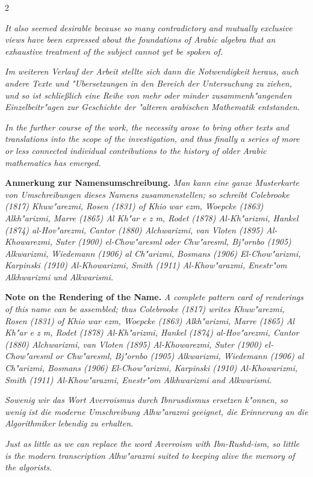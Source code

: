 \documentclass[10pt,a4paper]{article}
\begin{document}
\begin{paracol}{2}
\switchcolumn

\textit{It also seemed desirable because so many contradictory and mutually exclusive views have been expressed about the foundations of Arabic algebra that an exhaustive treatment of the subject cannot yet be spoken of.}

\switchcolumn*

\textit{Im weiteren Verlauf der Arbeit stellte sich dann die Notwendigkeit heraus, auch andere Texte und "Ubersetzungen in den Bereich der Untersuchung zu ziehen, und so ist schlie\ss{}lich eine Reihe von mehr oder minder zusammenh"angenden Einzelbeitr"agen zur Geschichte der "alteren arabischen Mathematik entstanden.}

\switchcolumn

\textit{In the further course of the work, the necessity arose to bring other texts and translations into the scope of the investigation, and thus finally a series of more or less connected individual contributions to the history of older Arabic mathematics has emerged.}

\switchcolumn*

\textbf{Anmerkung zur Namensumschreibung.} \textit{Man kann eine ganze Musterkarte von Umschreibungen dieses Namens zusammenstellen; so schreibt Colebrooke (1817) Khuw"arezmi, Rosen (1831) of Khio war ezm, Woepcke (1863) Alkh"arizmi, Marre (1865) Al Kh"ar e z m, Rodet (1878) Al-Kh"arizmi, Hankel (1874) al-Hov"arezmi, Cantor (1880) Alchwarizmi, van Vloten (1895) Al-Khowarezmi, Suter (1900) el-Chow"aresml oder Chw"aresml, Bj"ornbo (1905) Alkwarizmi, Wiedemann (1906) al Ch"arizmi, Bosmans (1906) El-Chow"arizmi, Karpinski (1910) Al-Khowarizmi, Smith (1911) Al-Khow"arazmi, Enestr"om Alkhwarizmi und Alkwarismi.}

\switchcolumn

\textbf{Note on the Rendering of the Name.} \textit{A complete pattern card of renderings of this name can be assembled; thus Colebrooke (1817) writes Khuw"arezmi, Rosen (1831) of Khio war ezm, Woepcke (1863) Alkh"arizmi, Marre (1865) Al Kh"ar e z m, Rodet (1878) Al-Kh"arizmi, Hankel (1874) al-Hov"arezmi, Cantor (1880) Alchwarizmi, van Vloten (1895) Al-Khowarezmi, Suter (1900) el-Chow"aresml or Chw"aresml, Bj"ornbo (1905) Alkwarizmi, Wiedemann (1906) al Ch"arizmi, Bosmans (1906) El-Chow"arizmi, Karpinski (1910) Al-Khowarizmi, Smith (1911) Al-Khow"arazmi, Enestr"om Alkhwarizmi and Alkwarismi.}

\switchcolumn*

\textit{Sowenig wir das Wort Averroismus durch Ibnrusdismus ersetzen k"onnen, so wenig ist die moderne Umschreibung Alhw"arazmi geeignet, die Erinnerung an die Algorithmiker lebendig zu erhalten.}

\switchcolumn

\textit{Just as little as we can replace the word Averroism with Ibn-Rushd-ism, so little is the modern transcription Alhw"arazmi suited to keeping alive the memory of the algorists.}

\end{paracol}
\end{document}
